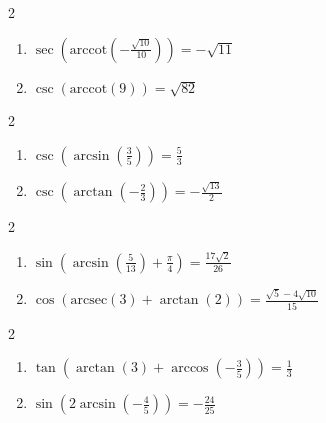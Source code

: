 \documentclass{ximera}
\begin{document}
\begin{multicols}{2}

\begin{enumerate}

\setcounter{enumi}{\value{HW}}

\item  $\sec\left(\text{arccot}\left(-\frac{\sqrt{10}}{10}\right)\right) = -\sqrt{11}$
\item  $\csc\left(\text{arccot}\left(9 \right)\right) = \sqrt{82}$ 

\setcounter{HW}{\value{enumi}}

\end{enumerate}

\end{multicols}

\begin{multicols}{2}

\begin{enumerate}

\setcounter{enumi}{\value{HW}}

\item  $\csc\left(\arcsin\left(\frac{3}{5}\right)\right) = \frac{5}{3}$
\item  $\csc\left(\arctan\left(-\frac{2}{3}\right)\right) = -\frac{\sqrt{13}}{2}$

\setcounter{HW}{\value{enumi}}

\end{enumerate}

\end{multicols}

\begin{multicols}{2}

\begin{enumerate}

\setcounter{enumi}{\value{HW}}

\item  $\sin\left(\arcsin\left( \frac{5}{13} \right) + \frac{\pi}{4}\right) = \frac{17\sqrt{2}}{26}$
\item  $\cos\left( \text{arcsec}(3) + \arctan(2) \right) = \frac{\sqrt{5} - 4\sqrt{10}}{15}$ %

\setcounter{HW}{\value{enumi}}

\end{enumerate}

\end{multicols}

\begin{multicols}{2}

\begin{enumerate}

\setcounter{enumi}{\value{HW}}

\item  $\tan\left( \arctan(3) + \arccos\left(-\frac{3}{5}\right) \right) = \frac{1}{3}$
\item  $\sin\left(2\arcsin\left(-\frac{4}{5}\right)\right)= -\frac{24}{25}$

\setcounter{HW}{\value{enumi}}

\end{enumerate}

\end{multicols}
\end{document}
